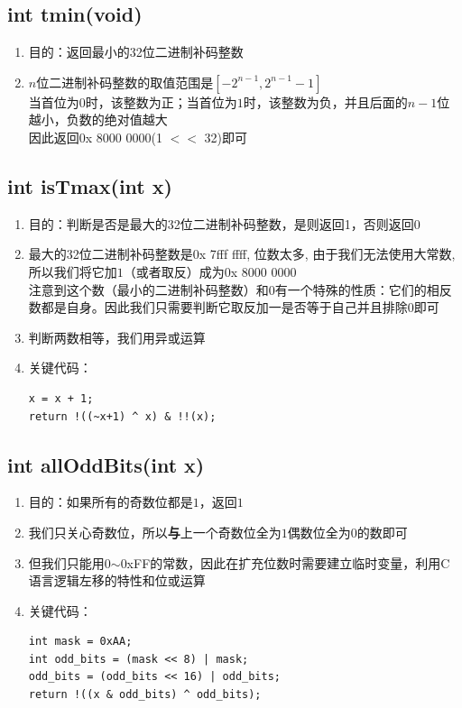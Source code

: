 \documentclass[12pt, a4paper, oneside]{ctexart}
\begin{document}
\subsection{int tmin(void)}
\begin{enumerate}
    \item 目的：返回最小的32位二进制补码整数
    \item $n$位二进制补码整数的取值范围是$[-2^{n-1},2^{n-1} - 1]$ \\
          当首位为$0$时，该整数为正；当首位为$1$时，该整数为负，并且后面的$n-1$位越小，负数的绝对值越大\\
          因此返回0x 8000 0000(1 $<<$ 32)即可
\end{enumerate}
\subsection{int isTmax(int x)}
\begin{enumerate}
    \item 目的：判断是否是最大的32位二进制补码整数，是则返回1，否则返回0
    \item 最大的32位二进制补码整数是0x 7fff ffff, 位数太多, 由于我们无法使用大常数, 所以我们将它加$1$（或者取反）成为0x 8000 0000 \\
          注意到这个数（最小的二进制补码整数）和$0$有一个特殊的性质：它们的相反数都是自身。因此我们只需要判断它取反加一是否等于自己并且排除$0$即可
    \item 判断两数相等，我们用异或运算
    \item 关键代码：
\begin{lstlisting}
x = x + 1;
return !((~x+1) ^ x) & !!(x);
\end{lstlisting}
\end{enumerate}
\subsection{int allOddBits(int x)}
\begin{enumerate}
    \item 目的：如果所有的奇数位都是$1$，返回$1$
    \item 我们只关心奇数位，所以\textbf{与}上一个奇数位全为$1$偶数位全为$0$的数即可
    \item 但我们只能用0$\sim$0xFF的常数，因此在扩充位数时需要建立临时变量，利用C语言逻辑左移的特性和位或运算
    \item 关键代码：
\begin{lstlisting}
int mask = 0xAA;
int odd_bits = (mask << 8) | mask;
odd_bits = (odd_bits << 16) | odd_bits;
return !((x & odd_bits) ^ odd_bits);
\end{lstlisting}
\end{enumerate}
\end{document}

